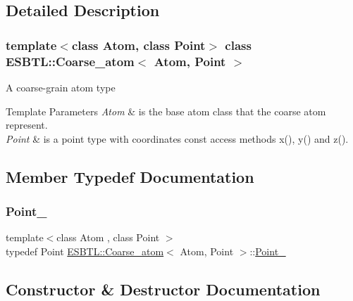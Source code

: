 \subsection{Detailed Description}
\subsubsection*{template$<$class Atom, class Point$>$\newline
class E\+S\+B\+T\+L\+::\+Coarse\+\_\+atom$<$ Atom, Point $>$}

A coarse-\/grain atom type 
\begin{DoxyTemplParams}{Template Parameters}
{\em Atom} & is the base atom class that the coarse atom represent. \\
\hline
{\em Point} & is a point type with coordinates const access methods x(), y() and z(). \\
\hline
\end{DoxyTemplParams}


\subsection{Member Typedef Documentation}
\mbox{\label{classESBTL_1_1Coarse__atom_acfe6c03e22cc26daef4776e7ca8a7db6}} 
\subsubsection{\texorpdfstring{Point\+\_}{Point\_3}}
{\footnotesize\ttfamily template$<$class Atom , class Point $>$ \\
typedef Point \hyperlink{classESBTL_1_1Coarse__atom}{E\+S\+B\+T\+L\+::\+Coarse\+\_\+atom}$<$ Atom, Point $>$\+::\hyperlink{classESBTL_1_1Coarse__atom_acfe6c03e22cc26daef4776e7ca8a7db6}{Point\+\_}}



\subsection{Constructor \& Destructor Documentation}
\mbox{\label{classESBTL_1_1Coarse__atom_ae1eb9078c6062f775c1390272c6764a9}} 
